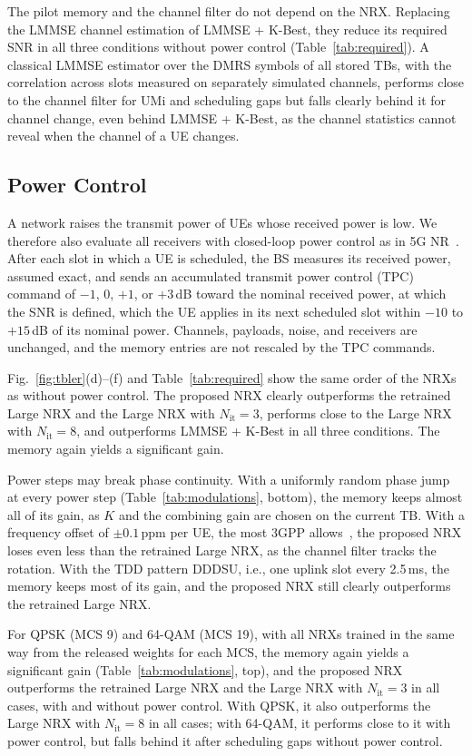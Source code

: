 The pilot memory and the channel filter do not depend on the NRX. Replacing the LMMSE channel estimation of LMMSE + K-Best, they reduce its required SNR in all three conditions without power control (Table~\ref{tab:required}). A classical LMMSE estimator over the DMRS symbols of all stored TBs, with the correlation across slots measured on separately simulated channels, performs close to the channel filter for UMi and scheduling gaps but falls clearly behind it for channel change, even behind LMMSE + K-Best, as the channel statistics cannot reveal when the channel of a UE changes.

\subsection{Power Control}
A network raises the transmit power of UEs whose received power is low. We therefore also evaluate all receivers with closed-loop power control as in 5G NR~\cite{3gpp38213}. After each slot in which a UE is scheduled, the BS measures its received power, assumed exact, and sends an accumulated transmit power control (TPC) command of $-1$, $0$, $+1$, or $+3$\,dB toward the nominal received power, at which the SNR is defined, which the UE applies in its next scheduled slot within $-10$ to $+15$\,dB of its nominal power. Channels, payloads, noise, and receivers are unchanged, and the memory entries are not rescaled by the TPC commands.

Fig.~\ref{fig:tbler}(d)--(f) and Table~\ref{tab:required} show the same order of the NRXs as without power control. The proposed NRX clearly outperforms the retrained Large NRX and the Large NRX with $N_{\mathrm{it}}=3$, performs close to the Large NRX with $N_{\mathrm{it}}=8$, and outperforms LMMSE + K-Best in all three conditions. The memory again yields a significant gain.

Power steps may break phase continuity. With a uniformly random phase jump at every power step (Table~\ref{tab:modulations}, bottom), the memory keeps almost all of its gain, as $K$ and the combining gain are chosen on the current TB. With a frequency offset of $\pm 0.1$\,ppm per UE, the most 3GPP allows~\cite{3gpp381011}, the proposed NRX loses even less than the retrained Large NRX, as the channel filter tracks the rotation. With the TDD pattern DDDSU, i.e., one uplink slot every 2.5\,ms, the memory keeps most of its gain, and the proposed NRX still clearly outperforms the retrained Large NRX.

For QPSK (MCS 9) and 64-QAM (MCS 19), with all NRXs trained in the same way from the released weights for each MCS, the memory again yields a significant gain (Table~\ref{tab:modulations}, top), and the proposed NRX outperforms the retrained Large NRX and the Large NRX with $N_{\mathrm{it}}=3$ in all cases, with and without power control. With QPSK, it also outperforms the Large NRX with $N_{\mathrm{it}}=8$ in all cases; with 64-QAM, it performs close to it with power control, but falls behind it after scheduling gaps without power control.

